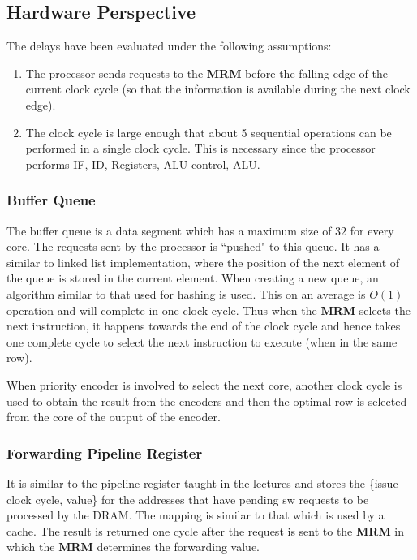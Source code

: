 \documentclass{article}
\begin{document}
\subsection{Hardware Perspective}
The delays have been evaluated under the following assumptions:
\begin{enumerate}
    \item The processor sends requests to the \textbf{MRM} before the falling edge of the current clock cycle (so that the information is available during the next clock edge).
    \item The clock cycle is large enough that about 5 sequential operations can be performed in a single clock cycle. This is necessary since the processor performs IF, ID, Registers, ALU control, ALU.
\end{enumerate}

\subsubsection*{Buffer Queue}
The buffer queue is a data segment which has a maximum size of $32$ for every core. The requests sent by the processor is ``pushed" to this queue. It has a similar to linked list implementation, where the position of the next element of the queue is stored in the current element. When creating a new queue, an algorithm similar to that used for hashing is used. This on an average is $O(1)$ operation and will complete in one clock cycle. Thus when the \textbf{MRM} selects the next instruction, it happens towards the end of the clock cycle and hence takes one complete cycle to select the next instruction to execute (when in the same row).\par
When priority encoder is involved to select the next core, another clock cycle is used to obtain the result from the encoders and then the optimal row is selected from the core of the output of the encoder.

\subsubsection*{Forwarding Pipeline Register}
It is similar to the pipeline register taught in the lectures and stores the \{issue clock cycle, value\} for the addresses that have pending sw requests to be processed by the DRAM. The mapping is similar to that which is used by a cache. The result is returned one cycle after the request is sent to the \textbf{MRM} in which the \textbf{MRM} determines the forwarding value.
\end{document}
